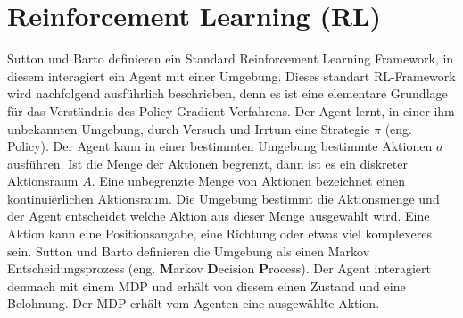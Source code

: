 \documentclass[conference]{IEEEtran}
\begin{document}



\section{Reinforcement Learning (RL)}
Sutton und Barto \cite{sutton_barto_12} definieren ein Standard Reinforcement Learning Framework, in diesem interagiert ein Agent mit einer Umgebung. Dieses standart RL-Framework wird nachfolgend ausführlich beschrieben, denn es ist eine elementare Grundlage für das Verständnis des Policy Gradient Verfahrens. Der Agent lernt, in einer ihm unbekannten Umgebung, durch Versuch und Irrtum eine Strategie $\pi$ (eng. Policy). Der Agent kann in einer bestimmten Umgebung bestimmte Aktionen $a$ ausführen. Ist die Menge der Aktionen begrenzt, dann ist es ein diskreter Aktionsraum $A$. Eine unbegrenzte Menge von Aktionen bezeichnet einen kontinuierlichen Aktionsraum. Die Umgebung bestimmt die Aktionsmenge und der Agent entscheidet welche Aktion aus dieser Menge ausgewählt wird. Eine Aktion kann eine Positionsangabe, eine Richtung oder etwas viel komplexeres sein. Sutton und Barto \cite{sutton_barto_12} definieren die Umgebung als einen Markov Entscheidungsprozess (eng. \textbf{M}arkov \textbf{D}ecision \textbf{P}rocess). Der Agent interagiert demnach mit einem MDP und erhält von diesem einen Zustand und eine Belohnung. Der MDP erhält vom Agenten eine ausgewählte Aktion. 
\end{document}
